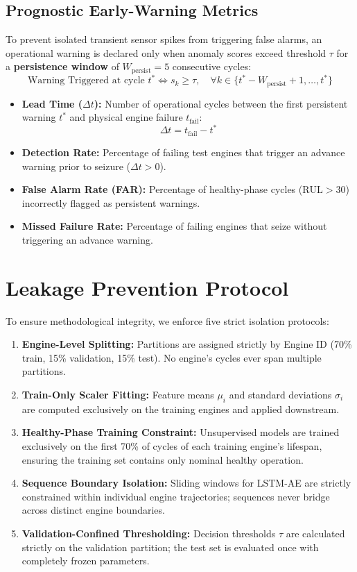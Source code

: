 \documentclass[12pt,a4paper,oneside]{report}
\begin{document}
\subsection{Prognostic Early-Warning Metrics}
To prevent isolated transient sensor spikes from triggering false alarms, an operational warning is declared only when anomaly scores exceed threshold $\tau$ for a \textbf{persistence window} of $W_{\text{persist}} = 5$ consecutive cycles:
\begin{equation}
    \text{Warning Triggered at cycle } t^* \iff s_k \ge \tau, \quad \forall k \in \{t^* - W_{\text{persist}} + 1, \dots, t^*\}
\end{equation}
\begin{itemize}
    \item \textbf{Lead Time ($\Delta t$):} Number of operational cycles between the first persistent warning $t^*$ and physical engine failure $t_{\text{fail}}$:
    \begin{equation}
        \Delta t = t_{\text{fail}} - t^*
    \end{equation}
    \item \textbf{Detection Rate:} Percentage of failing test engines that trigger an advance warning prior to seizure ($\Delta t > 0$).
    \item \textbf{False Alarm Rate (FAR):} Percentage of healthy-phase cycles ($\text{RUL} > 30$) incorrectly flagged as persistent warnings.
    \item \textbf{Missed Failure Rate:} Percentage of failing engines that seize without triggering an advance warning.
\end{itemize}

\section{Leakage Prevention Protocol}
To ensure methodological integrity, we enforce five strict isolation protocols:
\begin{enumerate}
    \item \textbf{Engine-Level Splitting:} Partitions are assigned strictly by Engine ID (70\% train, 15\% validation, 15\% test). No engine's cycles ever span multiple partitions.
    \item \textbf{Train-Only Scaler Fitting:} Feature means $\mu_i$ and standard deviations $\sigma_i$ are computed exclusively on the training engines and applied downstream.
    \item \textbf{Healthy-Phase Training Constraint:} Unsupervised models are trained exclusively on the first 70\% of cycles of each training engine's lifespan, ensuring the training set contains only nominal healthy operation.
    \item \textbf{Sequence Boundary Isolation:} Sliding windows for LSTM-AE are strictly constrained within individual engine trajectories; sequences never bridge across distinct engine boundaries.
    \item \textbf{Validation-Confined Thresholding:} Decision thresholds $\tau$ are calculated strictly on the validation partition; the test set is evaluated once with completely frozen parameters.
\end{enumerate}
\end{document}
